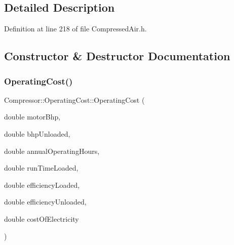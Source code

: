 \subsection{Detailed Description}


Definition at line 218 of file Compressed\+Air.\+h.



\subsection{Constructor \& Destructor Documentation}
\mbox{\label{class_compressor_1_1_operating_cost_aa5b9c984494fdfc08e31c2b7333f3657}} 
\subsubsection{\texorpdfstring{Operating\+Cost()}{OperatingCost()}\hspace{0.1cm}{\footnotesize\ttfamily [1/3]}}
{\footnotesize\ttfamily Compressor\+::\+Operating\+Cost\+::\+Operating\+Cost (\begin{DoxyParamCaption}\item[{double}]{motor\+Bhp,  }\item[{double}]{bhp\+Unloaded,  }\item[{double}]{annual\+Operating\+Hours,  }\item[{double}]{run\+Time\+Loaded,  }\item[{double}]{efficiency\+Loaded,  }\item[{double}]{efficiency\+Unloaded,  }\item[{double}]{cost\+Of\+Electricity }\end{DoxyParamCaption})}

